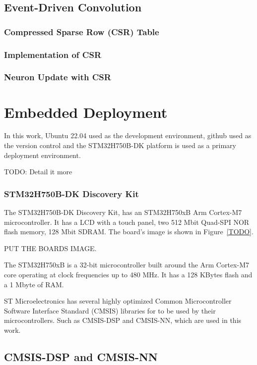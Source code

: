 \documentclass[11pt,a4paper]{article}
\begin{document}
\subsection{Event-Driven Convolution}

\subsubsection{Compressed Sparse Row (CSR) Table}
\subsubsection{Implementation of CSR}
\subsubsection{Neuron Update with CSR}



\section{Embedded Deployment}

In this work, Ubuntu 22.04 used as the development environment, github used as the version control and 
the STM32H750B-DK platform is used as a primary deployment environment. 

TODO: Detail it more


\subsubsection{STM32H750B-DK Discovery Kit}

The STM32H750B-DK Discovery Kit, has an STM32H750xB Arm Cortex-M7 microcontroller. 
It has a LCD with a touch panel, two 512 Mbit Quad-SPI NOR flash memory, 128 Mbit SDRAM. The board's image is shown in Figure~\ref{TODO}.

PUT THE BOARDS IMAGE.

The STM32H750xB is a 32-bit microcontroller built around the Arm Cortex-M7 core operating at clock frequencies up to 480 MHz. 
It has a 128 KBytes flash and a 1 Mbyte of RAM. 

ST Microelectronics has several highly optimized Common Microcontroller Software Interface Standard (CMSIS) libraries for to be used by their microcontrollers. 
Such as CMSIS-DSP and CMSIS-NN, which are used in this work.



\subsection{CMSIS-DSP and CMSIS-NN}
\end{document}
